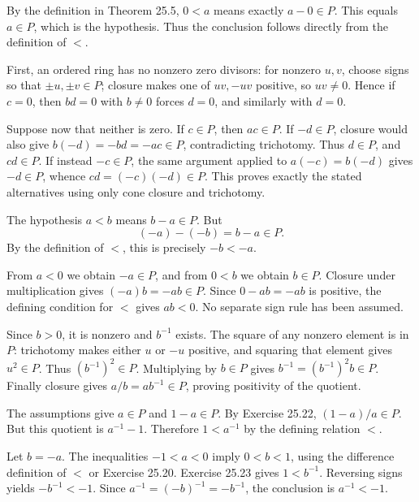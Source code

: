 By the definition in Theorem 25.5, $0<a$ means exactly $a-0\in P$. This equals $a\in P$, which is the hypothesis. Thus the conclusion follows directly from the definition of $<$.

First, an ordered ring has no nonzero zero divisors: for nonzero $u,v$, choose signs so that $\pm u,\pm v\in P$; closure makes one of $uv,-uv$ positive, so $uv\ne0$. Hence if $c=0$, then $bd=0$ with $b\ne0$ forces $d=0$, and similarly with $d=0$.\par
Suppose now that neither is zero. If $c\in P$, then $ac\in P$. If $-d\in P$, closure would also give $b(-d)=-bd=-ac\in P$, contradicting trichotomy. Thus $d\in P$, and $cd\in P$. If instead $-c\in P$, the same argument applied to $a(-c)=b(-d)$ gives $-d\in P$, whence $cd=(-c)(-d)\in P$. This proves exactly the stated alternatives using only cone closure and trichotomy.

The hypothesis $a<b$ means $b-a\in P$. But
\[(-a)-(-b)=b-a\in P.
\]
By the definition of $<$, this is precisely $-b<-a$.

From $a<0$ we obtain $-a\in P$, and from $0<b$ we obtain $b\in P$. Closure under multiplication gives $(-a)b=-ab\in P$. Since $0-ab=-ab$ is positive, the defining condition for $<$ gives $ab<0$. No separate sign rule has been assumed.

Since $b>0$, it is nonzero and $b^{-1}$ exists. The square of any nonzero element is in $P$: trichotomy makes either $u$ or $-u$ positive, and squaring that element gives $u^2\in P$. Thus $(b^{-1})^2\in P$. Multiplying by $b\in P$ gives $b^{-1}=(b^{-1})^2b\in P$. Finally closure gives $a/b=ab^{-1}\in P$, proving positivity of the quotient.

The assumptions give $a\in P$ and $1-a\in P$. By Exercise 25.22, $(1-a)/a\in P$. But this quotient is $a^{-1}-1$. Therefore $1<a^{-1}$ by the defining relation $<$.

Let $b=-a$. The inequalities $-1<a<0$ imply $0<b<1$, using the difference definition of $<$ or Exercise 25.20. Exercise 25.23 gives $1<b^{-1}$. Reversing signs yields $-b^{-1}<-1$. Since $a^{-1}=(-b)^{-1}=-b^{-1}$, the conclusion is $a^{-1}<-1$.

